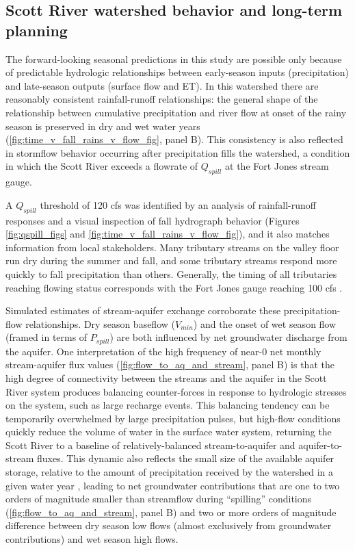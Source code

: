 \documentclass[hess, manuscript]{copernicus}
\begin{document}
\subsection{Scott River watershed behavior and long-term planning}

The forward-looking seasonal predictions in this study are possible only
because of predictable hydrologic relationships between early-season
inputs (precipitation) and late-season outputs (surface flow and ET). In
this watershed there are reasonably consistent rainfall-runoff
relationships: the general shape of the relationship between cumulative
precipitation and river flow at onset of the rainy season is preserved
in dry and wet water years (\autoref{fig:time_v_fall_rains_v_flow_fig},
panel B). This consistency is also reflected in stormflow behavior
occurring after precipitation fills the watershed, a condition in which
the Scott River exceeds a flowrate of \(Q_{spill}\) at the Fort Jones
stream gauge.

A \(Q_{spill}\) threshold of 120 cfs was identified by an analysis of
rainfall-runoff responses and a visual inspection of fall hydrograph
behavior (Figures \ref{fig:qspill_figs} and
\ref{fig:time_v_fall_rains_v_flow_fig}), and it also matches information
from local stakeholders. Many tributary streams on the valley floor run
dry during the summer and fall, and some tributary streams respond more
quickly to fall precipitation than others. Generally, the timing of all
tributaries reaching flowing status corresponds with the Fort Jones
gauge reaching 100 cfs \citep{Sommarstrom2020}.

Simulated estimates of stream-aquifer exchange corroborate these
precipitation-flow relationships. Dry season baseflow (\(V_{min}\)) and
the onset of wet season flow (framed in terms of \(P_{spill}\)) are both
influenced by net groundwater discharge from the aquifer. One
interpretation of the high frequency of near-0 net monthly
stream-aquifer flux values (\autoref{fig:flow_to_aq_and_stream}, panel
B) is that the high degree of connectivity between the streams and the
aquifer in the Scott River system produces balancing counter-forces in
response to hydrologic stresses on the system, such as large recharge
events. This balancing tendency can be temporarily overwhelmed by large
precipitation pulses, but high-flow conditions quickly reduce the volume
of water in the surface water system, returning the Scott River to a
baseline of relatively-balanced stream-to-aquifer and aquifer-to-stream
fluxes. This dynamic also reflects the small size of the available
aquifer storage, relative to the amount of precipitation received by the
watershed in a given water year \citeyearpar[DWR][]{DWR2004}, leading to
net groundwater contributions that are one to two orders of magnitude
smaller than streamflow during ``spilling'' conditions
(\autoref{fig:flow_to_aq_and_stream}, panel B) and two or more orders of
magnitude difference between dry season low flows (almost exclusively
from groundwater contributions) and wet season high flows.
\end{document}
